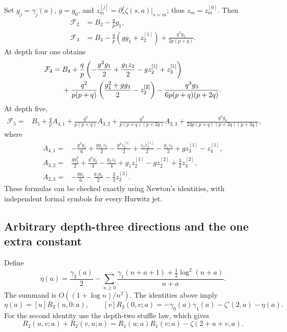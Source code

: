 \documentclass[11pt,letterpaper]{article}
\numberwithin{equation}{section}
\theoremstyle{definition}
\theoremstyle{remark}
\begin{document}
Set $g_j=\gamma_j(a)$, $g=g_0$, and
$z_m^{[j]}=\partial_s^j\zeta(s,a)|_{s=m}$; thus
$z_m=z_m^{[0]}$. Then
\begin{align}\label{ord:F2}
 \mathcal F_2&=B_2-\frac qp g_1,\\
 \mathcal F_3&=B_3-\frac qp(gg_1+z_2^{[1]})
                  +\frac{q^2g_2}{2p(p+q)}.\label{ord:F3}
\end{align}
At depth four one obtains
\begin{align}\label{ord:F4}
 \mathcal F_4={}&B_4+
 \frac qp\left(-\frac{g^2g_1}{2}+\frac{g_1z_2}{2}
                        -gz_2^{[1]}+z_3^{[1]}\right)\notag\\
 &+\frac{q^2}{p(p+q)}
       \left(\frac{g_1^2+gg_2}{2}-z_2^{[2]}\right)
 -\frac{q^3g_3}{6p(p+q)(p+2q)}.
\end{align}
At depth five,
\begin{align}\label{ord:F5}
 \mathcal F_5={}&B_5+\frac qp A_{4,1}
 +\frac{q^2}{p(p+q)}A_{3,2}
 +\frac{q^3}{p(p+q)(p+2q)}A_{2,3}
 +\frac{q^4g_4}{24p(p+q)(p+2q)(p+3q)},
\end{align}
where
\begin{align*}
 A_{4,1}={}&-\frac{g^3g_1}{6}+\frac{gg_1z_2}{2}
 -\frac{g^2z_2^{[1]}}2+\frac{z_2z_2^{[1]}}2
 -\frac{g_1z_3}{3}+gz_3^{[1]}-z_4^{[1]},\\
 A_{3,2}={}&\frac{gg_1^2}{2}+\frac{g^2g_2}{4}
 -\frac{g_2z_2}{4}+g_1z_2^{[1]}-gz_2^{[2]}
 +\frac32z_3^{[2]},\\
 A_{2,3}={}&-\frac{gg_3}{6}-\frac{g_1g_2}{2}
 -\frac23z_2^{[3]}.
\end{align*}
These formulas can be checked exactly using Newton's identities, with
independent formal symbols for every Hurwitz jet.

\subsection{Arbitrary depth-three directions and the one extra constant}

Define
\begin{equation}\label{ord:etadef}
 \eta(a)=\frac{\gamma_2(a)}2-
 \sum_{n\ge0}\frac{\gamma_1(n+a+1)+\tfrac12\log^2(n+a)}{n+a}.
\end{equation}
The summand is $O((1+\log n)/n^2)$.
The identities above imply
\[
 \eta(a)=[u]R_2(u,0;a),\qquad
 [v]R_2(0,v;a)=-\gamma_0(a)\gamma_1(a)-\zeta'(2,a)-\eta(a).
\]
For the second identity use the depth-two stuffle law, which gives
\[
 R_2(u,v;a)+R_2(v,u;a)
 =R_1(u;a)R_1(v;a)-\zeta(2+u+v,a).
\]
\end{document}

